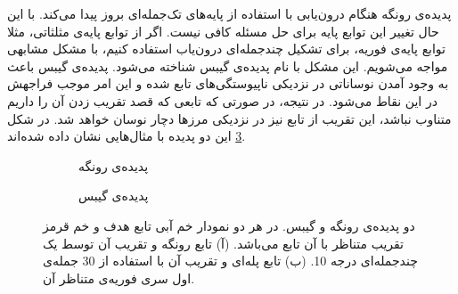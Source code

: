 \documentclass[12pt,onecolumn,a4paper]{article}
\begin{document}
پدیده‌ی رونگه هنگام درون‌یابی با استفاده از پایه‌های تک‌جمله‌ای 
بروز پیدا می‌کند. با این حال تغییر این توابع پایه برای حل مسئله کافی نیست. اگر از توابع پایه‌ی مثلثاتی، مثلا توابع پایه‌ی فوریه، برای تشکیل چندجمله‌ای درون‌یاب استفاده کنیم، با مشکل مشابهی مواجه می‌شویم. این مشکل  با نام پدیده‌ی گیبس
شناخته می‌شود. پدیده‌ی گیبس باعث به وجود آمدن نوساناتی در نزدیکی ناپیوستگی‌های تابع شده و این امر موجب فراجهش
در این نقاط می‌شود. در نتیجه، در صورتی که تابعی که قصد تقریب زدن آن را داریم متناوب نباشد، این تقریب از تابع نیز در نزدیکی مرزها دچار نوسان خواهد شد. در شکل 
\ref{fig:runge_gibbs} 
این دو پدیده با مثال‌هایی نشان داده‌ شده‌اند.

 \begin{figure}
    \centering
    \begin{subfigure}[b]{0.45\textwidth}
        \centering
        \caption{پدیده‌ی رونگه}
        \label{fig:runge}
    \end{subfigure}
    \hfill
    \begin{subfigure}[b]{0.45\textwidth}
        \centering
        \caption{پدیده‌ی گیبس}
        \label{fig:gibbs}
    \end{subfigure}
       \caption{دو پدیده‌ی رونگه و گیبس. در هر دو نمودار خم آبی تابع هدف و خم قرمز تقریب متناظر با آن تابع می‌باشد. (آ) تابع رونگه و تقریب آن توسط یک چندجمله‌ای درجه 10. (ب) تابع پله‌ای و تقریب آن با استفاده از 30 جمله‌ی اول سری فوریه‌ی متناظر آن.}
       \label{fig:runge_gibbs}
\end{figure}
\end{document}
